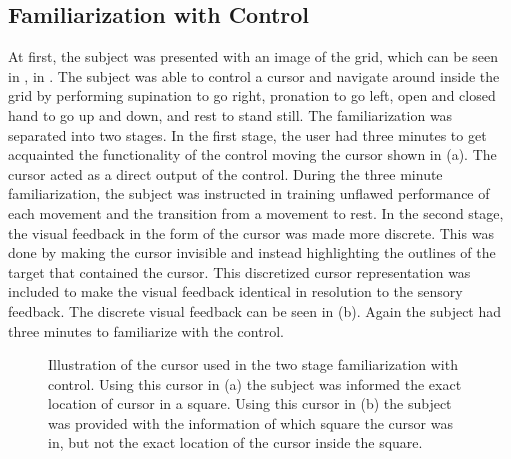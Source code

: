\subsection{Familiarization with Control} \label{sec:meth:contrain}

At first, the subject was presented with an image of the grid, which can be seen in , in . The subject was able to control a cursor and navigate around inside the grid by performing supination to go right, pronation to go left, open and closed hand to go up and down, and rest to stand still. The familiarization was separated into two stages. In the first stage, the user had three minutes to get acquainted the functionality of the control moving the cursor shown in  (a). The cursor acted as a direct output of the control. During the three minute familiarization, the subject was instructed in training unflawed performance of each movement and the transition from a movement to rest. In the second stage, the visual feedback in the form of the cursor was made more discrete. This was done by making the cursor invisible and instead highlighting the outlines of the target that contained the cursor. This discretized cursor representation was included to make the visual feedback identical in resolution to the sensory feedback. The discrete visual feedback can be seen in  (b). Again the subject had three minutes to familiarize with the control. 

\begin{figure}[H]
	\hspace{0.9cm}
	\caption{Illustration of the cursor used in the two stage familiarization with control.  Using this cursor in (a) the subject was informed the exact location of cursor in a square. Using this cursor in (b) the subject was provided with the information of which square the cursor was in, but not the exact location of the cursor inside the square. }
	\label{fig:C1}
\end{figure}

